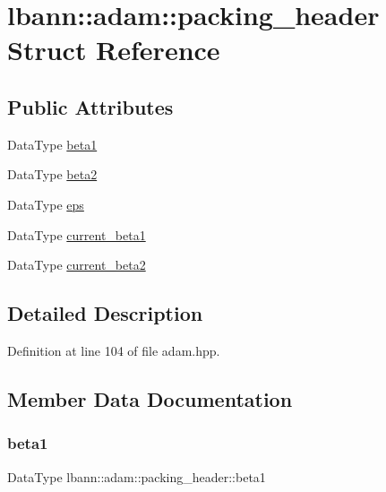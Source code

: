 \hypertarget{structlbann_1_1adam_1_1packing__header}{}\section{lbann\+:\+:adam\+:\+:packing\+\_\+header Struct Reference}
\label{structlbann_1_1adam_1_1packing__header}
\subsection*{Public Attributes}
\begin{DoxyCompactItemize}
\item 
Data\+Type \hyperlink{structlbann_1_1adam_1_1packing__header_a7078ddcfad050544473744a3a7b87899}{beta1}
\item 
Data\+Type \hyperlink{structlbann_1_1adam_1_1packing__header_a91d43f487f4c5da1694671fa5966964c}{beta2}
\item 
Data\+Type \hyperlink{structlbann_1_1adam_1_1packing__header_a31051ef5ef2bac2c34eb0fc959dc7494}{eps}
\item 
Data\+Type \hyperlink{structlbann_1_1adam_1_1packing__header_a641d0ce43601873c94d5c9e649125e4e}{current\+\_\+beta1}
\item 
Data\+Type \hyperlink{structlbann_1_1adam_1_1packing__header_a813bafcd1aeb3443c4349f29a5231561}{current\+\_\+beta2}
\end{DoxyCompactItemize}


\subsection{Detailed Description}


Definition at line 104 of file adam.\+hpp.



\subsection{Member Data Documentation}
\mbox{\label{structlbann_1_1adam_1_1packing__header_a7078ddcfad050544473744a3a7b87899}} 
\subsubsection{\texorpdfstring{beta1}{beta1}}
{\footnotesize\ttfamily Data\+Type lbann\+::adam\+::packing\+\_\+header\+::beta1}



